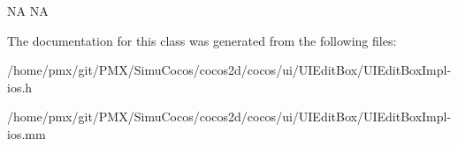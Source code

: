 NA  NA 

The documentation for this class was generated from the following files\+:\begin{DoxyCompactItemize}
\item 
/home/pmx/git/\+P\+M\+X/\+Simu\+Cocos/cocos2d/cocos/ui/\+U\+I\+Edit\+Box/U\+I\+Edit\+Box\+Impl-\/ios.\+h\item 
/home/pmx/git/\+P\+M\+X/\+Simu\+Cocos/cocos2d/cocos/ui/\+U\+I\+Edit\+Box/U\+I\+Edit\+Box\+Impl-\/ios.\+mm\end{DoxyCompactItemize}
